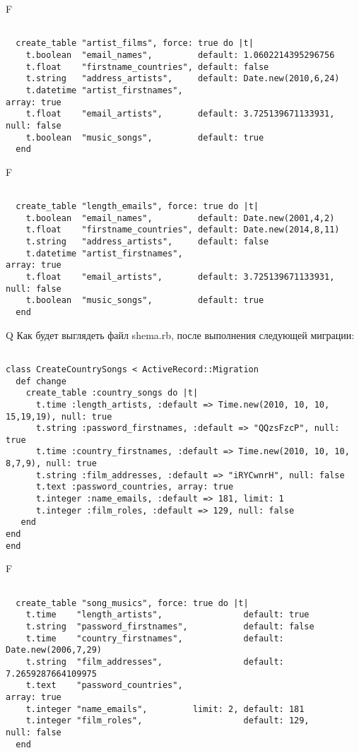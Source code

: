 F
\begin{verbatim}

  create_table "artist_films", force: true do |t|
    t.boolean  "email_names",         default: 1.0602214395296756
    t.float    "firstname_countries", default: false
    t.string   "address_artists",     default: Date.new(2010,6,24)
    t.datetime "artist_firstnames",                                            array: true
    t.float    "email_artists",       default: 3.725139671133931, null: false
    t.boolean  "music_songs",         default: true
  end

\end{verbatim}

F
\begin{verbatim}

  create_table "length_emails", force: true do |t|
    t.boolean  "email_names",         default: Date.new(2001,4,2)
    t.float    "firstname_countries", default: Date.new(2014,8,11)
    t.string   "address_artists",     default: false
    t.datetime "artist_firstnames",                                            array: true
    t.float    "email_artists",       default: 3.725139671133931, null: false
    t.boolean  "music_songs",         default: true
  end

\end{verbatim}

Q
Как будет выглядеть файл shema.rb, после выполнения следующей миграции:

\begin{verbatim}

class CreateCountrySongs < ActiveRecord::Migration 
  def change 
    create_table :country_songs do |t| 
      t.time :length_artists, :default => Time.new(2010, 10, 10, 15,19,19), null: true
      t.string :password_firstnames, :default => "QQzsFzcP", null: true
      t.time :country_firstnames, :default => Time.new(2010, 10, 10, 8,7,9), null: true
      t.string :film_addresses, :default => "iRYCwnrH", null: false
      t.text :password_countries, array: true
      t.integer :name_emails, :default => 181, limit: 1
      t.integer :film_roles, :default => 129, null: false
   end
end
end
\end{verbatim}

F
\begin{verbatim}

  create_table "song_musics", force: true do |t|
    t.time    "length_artists",                default: true
    t.string  "password_firstnames",           default: false
    t.time    "country_firstnames",            default: Date.new(2006,7,29)
    t.string  "film_addresses",                default: 7.2659287664109975
    t.text    "password_countries",                                                         array: true
    t.integer "name_emails",         limit: 2, default: 181
    t.integer "film_roles",                    default: 129,                   null: false
  end

\end{verbatim}

